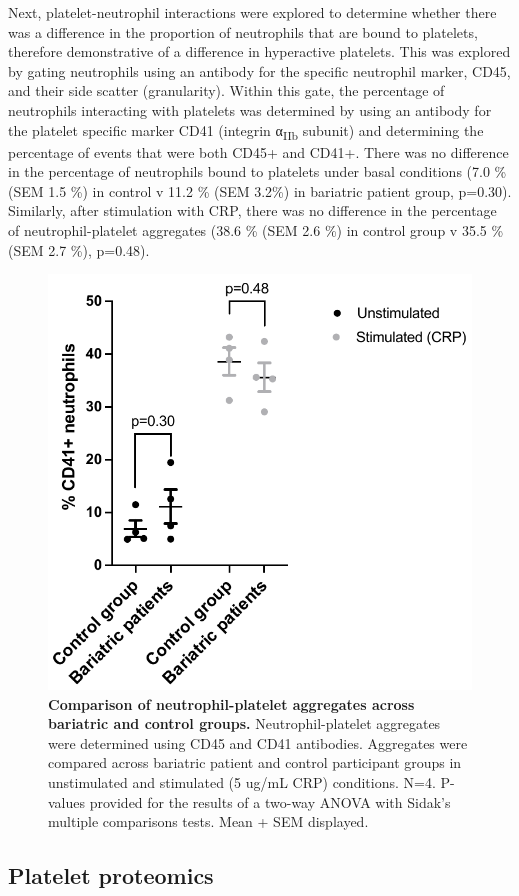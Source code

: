 \documentclass[11pt,twoside]{bristolthesis}
\begin{document}
Next, platelet-neutrophil interactions were explored to determine whether there was a difference in the proportion of neutrophils that are bound to platelets, therefore demonstrative of a difference in hyperactive platelets. This was explored by gating neutrophils using an antibody for the specific neutrophil marker, CD45, and their side scatter (granularity). Within this gate, the percentage of neutrophils interacting with platelets was determined by using an antibody for the platelet specific marker CD41 (integrin α\textsubscript{IIb} subunit) and determining the percentage of events that were both CD45+ and CD41+. There was no difference in the percentage of neutrophils bound to platelets under basal conditions (7.0 \% (SEM 1.5 \%) in control v 11.2 \% (SEM 3.2\%) in bariatric patient group, p=0.30). Similarly, after stimulation with CRP, there was no difference in the percentage of neutrophil-platelet aggregates (38.6 \% (SEM 2.6 \%) in control group v 35.5 \% (SEM 2.7 \%), p=0.48).



\begin{figure}
\includegraphics[width=0.7\linewidth]{figure/Bariatric_study/Plt-neu_aggregates} \caption[Comparison of neutrophil-platelet aggregates across bariatric and control groups.]{\textbf{Comparison of neutrophil-platelet aggregates across bariatric and control groups.} Neutrophil-platelet aggregates were determined using CD45 and CD41 antibodies. Aggregates were compared across bariatric patient and control participant groups in unstimulated and stimulated (5 ug/mL CRP) conditions. N=4. P-values provided for the results of a two-way ANOVA with Sidak's multiple comparisons tests. Mean + SEM displayed.}\label{fig:platelet-neutrophil}
\end{figure}
\hypertarget{platelet-proteomics}{%
\subsection{Platelet proteomics}\label{platelet-proteomics}}
\end{document}
